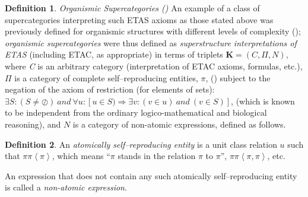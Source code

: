 \documentclass[12pt]{article}
\theoremstyle{plain}
\theoremstyle{definition}
\newtheorem{definition}{Definition}[section]
\numberwithin{equation}{section}
\begin{document}
\begin{definition} 
\emph{Organismic Supercategories (\cite{Refs-13to26})}
An example of a class of supercategories interpreting such ETAS axioms as those stated above
was previously defined for organismic structures with different levels of complexity (\cite{Refs-13to26}); {\em organismic supercategories} were thus defined as {\em superstructure interpretations of ETAS} (including ETAC, as appropriate) in terms of triplets $\textbf{K} = (\textit{C}, \Pi,\textit{N})$, where \textit{C} is an arbitrary category (interpretation of ETAC axioms, formulas, etc.), $\Pi$ is a category of complete self--reproducing entities, $\pi$, (\cite{LO68}) subject to the negation of the axiom of restriction (for elements of sets):
$ \exists S: (S \neq \oslash) ~ and ~ \forall u: [u \in S) \Rightarrow \exists v: (v \in u)~ and ~( v \in S)]$, (which is known to be independent from the ordinary logico-mathematical and biological reasoning), 
and $\textit{N}$ is a category of non-atomic expressions, defined as follows.  
\end{definition} 

\begin{definition}
 
 An {\em atomically self--reproducing entity} is a unit class relation $u$ such that  $\pi \pi \left\langle \pi \right\rangle$, which means 
``$\pi$ stands in the relation $\pi$ to $\pi$'', $\pi \pi \left\langle \pi , \pi \right\rangle$, etc. 

 An expression that does not contain any such atomically self--reproducing entity is called a {\em non-atomic expression}.
\end{definition} 
\end{document}
